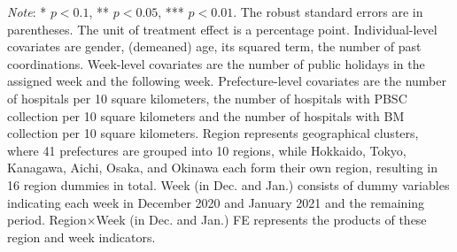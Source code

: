 \documentclass[12pt, a4paper]{article}
\begin{document}
\begin{table}[H]
\begin{threeparttable}
\begin{tablenotes}
\item \emph{Note}: * $p < 0.1$, ** $p < 0.05$, *** $p < 0.01$. The robust standard errors are in parentheses. The unit of treatment effect is a percentage point. Individual-level covariates are gender, (demeaned) age, its squared term, the number of past coordinations. Week-level covariates are the number of public holidays in the assigned week and the following week. Prefecture-level covariates are the number of hospitals per 10 square kilometers, the number of hospitals with PBSC collection per 10 square kilometers and the number of hospitals with BM collection per 10 square kilometers. Region represents geographical clusters, where 41 prefectures are grouped into 10 regions, while Hokkaido, Tokyo, Kanagawa, Aichi, Osaka, and Okinawa each form their own region, resulting in 16 region dummies in total. Week (in Dec. and Jan.) consists of dummy variables indicating each week in December 2020 and January 2021 and the remaining period. Region$\times$Week (in Dec. and Jan.) FE represents the products of these region and week indicators.
\end{tablenotes}
\end{threeparttable}
\end{table}
\end{document}
